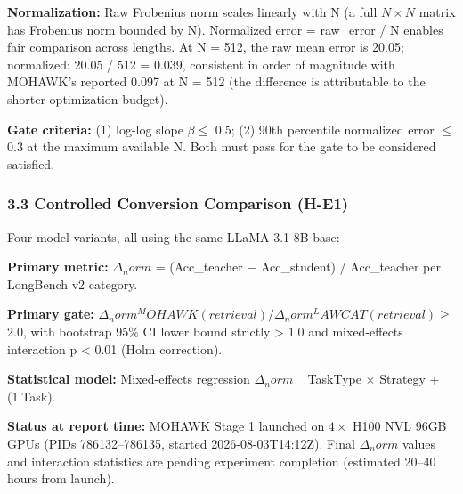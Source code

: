 \textbf{Normalization:} Raw Frobenius norm scales linearly with N (a full $N\times N$ matrix has Frobenius norm bounded by N). Normalized error = raw\_error / N enables fair comparison across lengths. At N = 512, the raw mean error is 20.05; normalized: 20.05 / 512 = 0.039, consistent in order of magnitude with MOHAWK's reported 0.097 at N = 512 (the difference is attributable to the shorter optimization budget).

\textbf{Gate criteria:} (1) log-log slope $\beta \leq$ 0.5; (2) 90th percentile normalized error $\leq$ 0.3 at the maximum available N. Both must pass for the gate to be considered satisfied.

\subsubsection{3.3 Controlled Conversion Comparison (H-E1)}

Four model variants, all using the same LLaMA-3.1-8B base:

\begin{table}[htbp]
\centering
{}
\end{table}

\textbf{Primary metric:} $\Delta _norm$ = (Acc\_teacher $-$ Acc\_student) / Acc\_teacher per LongBench v2 category.

\textbf{Primary gate:} $\Delta _norm^MOHAWK(retrieval) / \Delta _norm^LAWCAT(retrieval) \geq$ 2.0, with bootstrap 95\% CI lower bound strictly > 1.0 and mixed-effects interaction p < 0.01 (Holm correction).

\textbf{Statistical model:} Mixed-effects regression $\Delta _norm$ ~ TaskType $\times$ Strategy + (1|Task).

\textbf{Status at report time:} MOHAWK Stage 1 launched on $4\times$ H100 NVL 96GB GPUs (PIDs 786132--786135, started 2026-08-03T14:12Z). Final $\Delta _norm$ values and interaction statistics are pending experiment completion (estimated 20--40 hours from launch).


